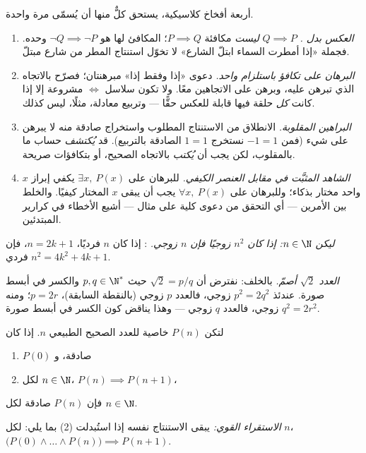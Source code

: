 \begin{remark}\label{rem:b1:logic:pitfalls}
أربعة أفخاخ كلاسيكية، يستحق كلٌّ منها أن يُسمّى مرة واحدة.
\begin{enumerate}
  \item \emph{العكس بدل .}  $Q \implies P$
        \emph{ليست} مكافئة  $P \implies Q$؛ المكافئ لها هو
        $\lnot Q
        \implies \lnot P$ وحده. فجملة «إذا أمطرت السماء
        ابتلّ الشارع» لا تخوّل استنتاج المطر من شارع مبتلّ.
  \item \emph{البرهان على تكافؤ باستلزام واحد.} دعوى «إذا وفقط
        إذا» مبرهنتان؛ فصرّح بالاتجاه الذي تبرهن عليه، وبرهن على
        الاتجاهين معًا. ولا تكون سلاسل $\iff$ مشروعة إلا إذا كانت
        \emph{كل} حلقة فيها قابلة للعكس حقًّا --- وتربيع معادلة،
        مثلًا، ليس كذلك.
  \item \emph{البراهين المقلوبة.} الانطلاق من الاستنتاج المطلوب
        واستخراج  صادقة منه لا يبرهن على شيء (فمن $-1 = 1$
        نستخرج $1 = 1$ الصادقة بالتربيع). قد \emph{يُكتشف} حساب
        ما بالمقلوب، لكن يجب أن \emph{يُكتب} بالاتجاه الصحيح، أو
        بتكافؤات صريحة.
  \item \emph{الشاهد المثبَّت في مقابل العنصر الكيفي.} للبرهان
        على $\exists x,\ P(x)$ يكفي إبراز $x$ واحد مختار بذكاء؛
        وللبرهان على $\forall x,\ P(x)$ يجب أن يبقى $x$ المختار
        كيفيًا. والخلط بين الأمرين --- أي التحقق من دعوى كلية
        على مثال --- أشيع الأخطاء في كرارير المبتدئين.
\end{enumerate}
\end{remark}

\begin{example}\label{ex:b1:logic:sqrt2}
\emph{ليكن $n \in \N$: إذا كان $n^2$ زوجيًا فإن $n$ زوجي.} : إذا كان $n$ فرديًا، $n = 2k+1$، فإن
$n^2 = 4k^2 + 4k + 1$ فردي.

\emph{العدد $\sqrt 2$ أصمّ.} بالخلف: نفترض أن
$\sqrt 2 = p/q$ حيث $p, q \in \N^*$ والكسر في أبسط صورة.
عندئذ $p^2 = 2q^2$ زوجي، فالعدد $p$ زوجي (بالنقطة السابقة)، $p = 2r$؛
ومنه $q^2 = 2r^2$ زوجي، فالعدد $q$ زوجي --- وهذا يناقض كون الكسر في
أبسط صورة.
\end{example}

\begin{theorem}[الاستقراء]\label{thm:b1:logic:induction}
لتكن $P(n)$ خاصية للعدد الصحيح الطبيعي $n$. إذا كان
\begin{enumerate}
  \item $P(0)$ صادقة، و
  \item لكل $n \in \N$، $P(n) \implies P(n+1)$،
\end{enumerate}
فإن $P(n)$ صادقة لكل $n \in \N$.

\emph{الاستقراء القوي:} يبقى الاستنتاج نفسه إذا استُبدلت (2) بما يلي:
لكل $n$، $\bigl(P(0) \land \dots \land P(n)\bigr) \implies
P(n+1)$.
\end{theorem}

